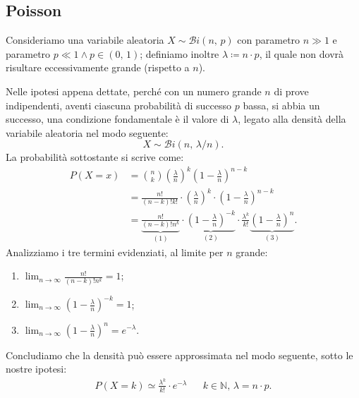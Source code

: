         \subsection{Poisson}
            \begin{defn}
                Consideriamo una variabile aleatoria $X \sim \mathcal{B}i(n,\,p)$ con parametro $n \gg 1$ e parametro  $p \ll 1 \land p \in (0,\, 1)$; definiamo inoltre $\lambda \coloneqq n \cdot p$, il quale non dovrà risultare eccessivamente grande (rispetto a $n$).

                Nelle ipotesi appena dettate, perché con un numero grande $n$ di prove indipendenti, aventi ciascuna probabilità di successo $p$ bassa, si abbia un successo, una condizione fondamentale è il valore di $\lambda$, legato alla densità della variabile aleatoria nel modo seguente: \[
                    X \sim \mathcal{B}i(n,\, \lambda / n)
                .\] La probabilità sottostante si scrive come:
                \begin{align*}
                    P(X = x) &= \binom{n}{k} \left(\frac{\lambda}{n}\right)^k \left(1-\frac{\lambda}{n}\right)^{n-k} \\
                             &= \frac{n!}{(n-k)!k!} \cdot \left(\frac{\lambda}{n}\right)^k \cdot \left(1-\frac{\lambda}{n}\right)^{n-k} \\
                             &= \underset{(1)}{\underbrace{\frac{n!}{(n-k)!n^k}}} \cdot \underset{(2)}{\underbrace{\left(1-\frac{\lambda}{n}\right)^{-k}}} \cdot \frac{\lambda^k}{k!}\underset{(3)}{\underbrace{\left(1-\frac{\lambda}{n}\right)^{n}}}
                .\end{align*}
                Analizziamo i tre termini evidenziati, al limite per $n$ grande:
                \begin{enumerate}
                    \item $\lim_{n \to \infty} \frac{n!}{(n-k)!n^k} = 1$;
                    \item $\lim_{n \to \infty} \left(1-\frac{\lambda}{n}\right)^{-k} = 1$;
                    \item $\lim_{n \to \infty} \left(1-\frac{\lambda}{n}\right)^{n} = e^{-\lambda}$.
                \end{enumerate}
                Concludiamo che la densità può essere approssimata nel modo seguente, sotto le nostre ipotesi:
                \begin{align}\label{eq:Approssimazione_Binomiale_Poisson}
                        P(X = k) \simeq \frac{\lambda^k}{k!} \cdot e^{-\lambda} & &k \in \mathbb{N},\, \lambda = n \cdot p
                    .
                \end{align}


\end{defn}
